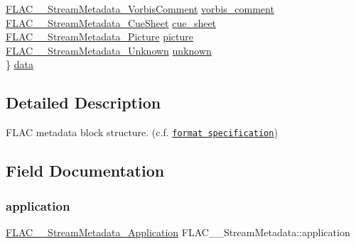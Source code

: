 \begin{DoxyCompactItemize}
\begin{tabbing}
\>\hyperlink{struct_f_l_a_c_____stream_metadata___vorbis_comment}{FLAC\_\_StreamMetadata\_VorbisComment} \hyperlink{struct_f_l_a_c_____stream_metadata_a02662cb0ff19e8229dcd2384f708bae0}{vorbis\_comment}\\
\>\hyperlink{struct_f_l_a_c_____stream_metadata___cue_sheet}{FLAC\_\_StreamMetadata\_CueSheet} \hyperlink{struct_f_l_a_c_____stream_metadata_a68e7d388eeb7e35076e016370a74e0ec}{cue\_sheet}\\
\>\hyperlink{struct_f_l_a_c_____stream_metadata___picture}{FLAC\_\_StreamMetadata\_Picture} \hyperlink{struct_f_l_a_c_____stream_metadata_a203cf5cce24097ef96efd5dd3bb7c8e7}{picture}\\
\>\hyperlink{struct_f_l_a_c_____stream_metadata___unknown}{FLAC\_\_StreamMetadata\_Unknown} \hyperlink{struct_f_l_a_c_____stream_metadata_ac29528515ea884b108a813a6609515bd}{unknown}\\
\} \hyperlink{struct_f_l_a_c_____stream_metadata_ab7fe3a1380ff8da77c6f6e01ec214dd3}{data}\\

\end{tabbing}\end{DoxyCompactItemize}


\subsection{Detailed Description}
F\+L\+AC metadata block structure. (c.\+f. \href{../format.html#metadata_block}{\tt format specification}) 

\subsection{Field Documentation}
\mbox{\label{struct_f_l_a_c_____stream_metadata_af16b029d4a476aeb46f9a215e2cce462}} 
\subsubsection{\texorpdfstring{application}{application}}
{\footnotesize\ttfamily \hyperlink{struct_f_l_a_c_____stream_metadata___application}{F\+L\+A\+C\+\_\+\+\_\+\+Stream\+Metadata\+\_\+\+Application} F\+L\+A\+C\+\_\+\+\_\+\+Stream\+Metadata\+::application}

